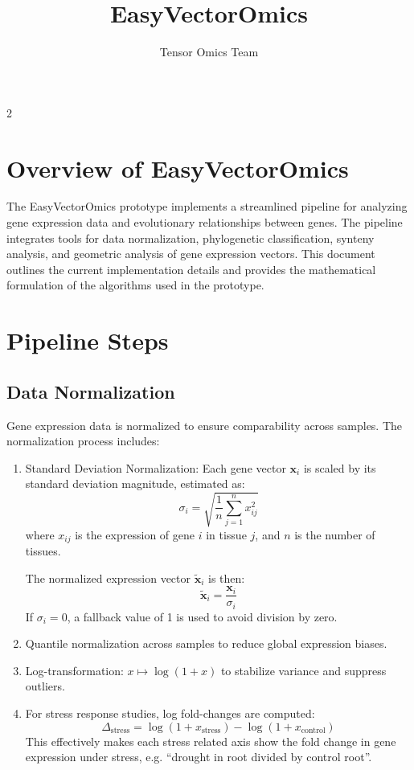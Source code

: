 2\documentclass{article}
\title{EasyVectorOmics}
\author{Tensor Omics Team}
\begin{document}
\maketitle

\section{Overview of EasyVectorOmics}

The EasyVectorOmics prototype implements a streamlined pipeline for analyzing gene expression data and evolutionary relationships between genes. The pipeline integrates tools for data normalization, phylogenetic classification, synteny analysis, and geometric analysis of gene expression vectors. This document outlines the current implementation details and provides the mathematical formulation of the algorithms used in the prototype.

\section{Pipeline Steps}

\subsection{Data Normalization}
Gene expression data is normalized to ensure comparability across samples. The normalization process includes:
\begin{enumerate}
    \item Standard Deviation Normalization: Each gene vector $\mathbf{x}_i$ is scaled by its standard deviation magnitude, estimated as:
    \begin{equation}
    \sigma_i = \sqrt{\frac{1}{n} \sum_{j=1}^n x_{ij}^2}
    \end{equation}
    where $x_{ij}$ is the expression of gene $i$ in tissue $j$, and $n$ is the number of tissues.
    
    The normalized expression vector $\tilde{\mathbf{x}}_i$ is then:
    \begin{equation}
    \tilde{\mathbf{x}}_i = \frac{\mathbf{x}_i}{\sigma_i}
    \end{equation}
    If $\sigma_i = 0$, a fallback value of 1 is used to avoid division by zero.
    
    \item Quantile normalization across samples to reduce global expression biases.
    \item Log-transformation: \( x \mapsto \log(1 + x) \) to stabilize variance and suppress outliers.
    \item For stress response studies, log fold-changes are computed: 
    \[
        \Delta_{\text{stress}} = \log(1 + x_{\text{stress}}) - \log(1 + x_{\text{control}})
    \]
    This effectively makes each stress related axis show the fold change in
    gene expression under stress, e.g. ``drought in root divided by control
    root''.
    
\end{enumerate}
\end{document}
